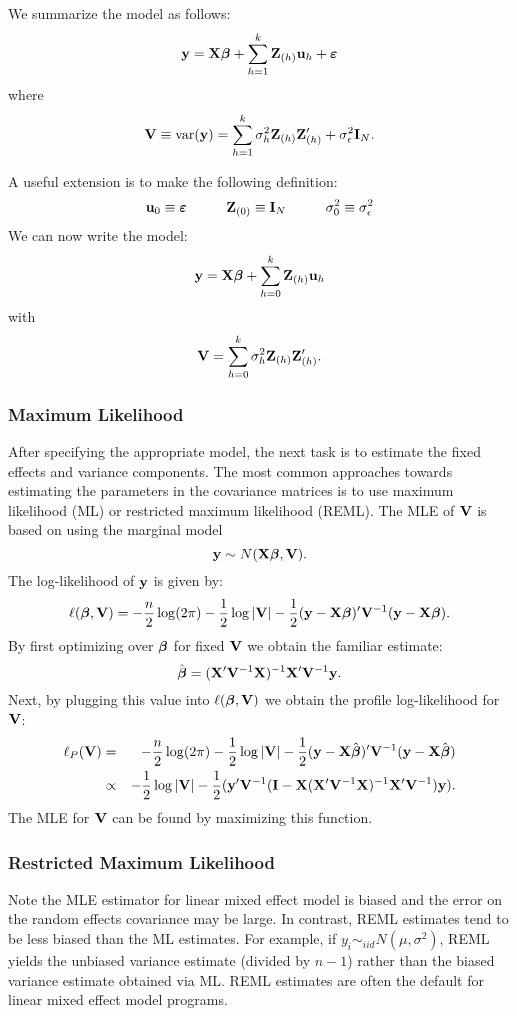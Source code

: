 We summarize the model as follows:
$$
\mathbf{y} = \mathbf{X} \mbox{\boldmath $\beta$} + \sum_{h=1}^k \mathbf{Z}_{(h)} \mathbf{u}_{h} + \mbox{\boldmath $\varepsilon$}
$$
where
$$
\mathbf{V} \equiv  \mathrm{var}(\mathbf{y}) =  \sum_{h=1}^k \sigma^2_{h} \mathbf{Z}_{(h)} \mathbf{Z}_{(h)}' + \sigma_\epsilon^2 \mathbf{I}_N. 
$$


A useful extension is to make the following definition:
\begin{eqnarray*}
\mathbf{u}_0 \equiv \mbox{\boldmath $\varepsilon$} \hskip1cm
\mathbf{Z}_{(0)} \equiv \mathbf{I}_N \hskip1cm
\sigma^2_0 \equiv \sigma^2_\epsilon 
\end{eqnarray*}
We can now write the model:
$$
\mathbf{y} = \mathbf{X} \mbox{\boldmath $\beta$} + \sum_{h=0}^k \mathbf{Z}_{(h)} \mathbf{u}_{h} $$
with
$$
\mathbf{V} =  \sum_{h=0}^k \sigma^2_{h} \mathbf{Z}_{(h)} \mathbf{Z}_{(h)}' . 
$$


\subsubsection{Maximum Likelihood}
After specifying the appropriate model, the next task  is to estimate the fixed effects and variance components. 
The most common approaches towards estimating the parameters in the covariance matrices is to use maximum likelihood (ML) or restricted maximum likelihood (REML).
The MLE of $\mathbf{V}$ is based on using the marginal model $$\mathbf{y} \sim N(\mathbf{X} \mbox{\boldmath $\beta$}, \mathbf{V}).$$
The log-likelihood of $\mathbf{y}$ is given by:
$$
\ell (\mbox{\boldmath $\beta$}, \mathbf{V}) = -\frac{n}{2}\log(2\pi) -\frac{1}{2}\log| \mathbf{V} | -\frac{1}{2} (\mathbf{y} - \mathbf{X}\mbox{\boldmath $\beta$})'\mathbf{V}^{-1}(\mathbf{y} - \mathbf{X}\mbox{\boldmath $\beta$}).
$$
By first optimizing over $\mbox{\boldmath $\beta$}$ for fixed $\mathbf{V}$ we obtain the familiar estimate:
$$
\hat {\mbox{\boldmath $\beta$}} = (\mathbf{X}' \mathbf{V}^{-1} \mathbf{X})^{-1} \mathbf{X}' \mathbf{V}^{-1}  \mathbf{y}.
$$
Next, by plugging this value into $\ell (\mbox{\boldmath $\beta$}, \mathbf{V})$ we obtain the profile log-likelihood for $\mathbf{V}$:
\begin{eqnarray*}
\ell_P (\mathbf{V}) &=& -\frac{n}{2}\log(2\pi) -\frac{1}{2}\log|\mathbf{V}| -\frac{1}{2} (\mathbf{y} - \mathbf{X}\hat {\mbox{\boldmath $\beta$}})' \mathbf{V}^{-1}(\mathbf{y} - \mathbf{X} \hat {\mbox{\boldmath $\beta$}}) \\
&\propto & -\frac{1}{2}\log|\mathbf{V}| -\frac{1}{2} (\mathbf{y}'  \mathbf{V}^{-1}( \mathbf{I} - \mathbf{X}(\mathbf{X}' \mathbf{V}^{-1} \mathbf{X})^{-1} \mathbf{X}'\mathbf{V}^{-1}) \mathbf{y}).
\end{eqnarray*}
The MLE for $\mathbf{V}$ can be found by maximizing this function.


\subsubsection{Restricted Maximum Likelihood}
Note the MLE estimator for linear mixed effect model is biased and the error on the random effects covariance may be large. 
In contrast, REML estimates tend to be less biased than the ML estimates. 
For example, if 
$y_i \sim_{iid} N(\mu, \sigma^2)$,  REML yields the unbiased variance estimate (divided by $n-1$)
rather than the biased variance estimate obtained via ML.
REML estimates are often the default for linear mixed effect model programs. 

